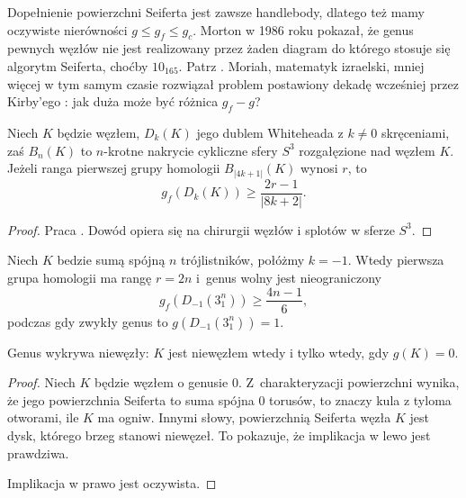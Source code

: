 Dopełnienie powierzchni Seiferta jest zawsze handlebody, dlatego też mamy oczywiste nierówności $g \le g_f \le g_c$.
Morton w 1986 roku pokazał, że genus pewnych węzłów nie jest realizowany przez żaden diagram do którego stosuje się algorytm Seiferta, choćby $10_{165}$.
Patrz \cite{morton86}.
Moriah, matematyk izraelski, mniej więcej w tym samym czasie rozwiązał problem postawiony dekadę wcześniej przez Kirby'ego \cite{kirby78}: jak duża może być różnica $g_f - g$?

\begin{proposition}
    Niech $K$ będzie węzłem, $D_k(K)$ jego dublem Whiteheada z $k \neq 0$ skręceniami, zaś $B_n(K)$ to $n$-krotne nakrycie cykliczne sfery $S^3$ rozgałęzione nad węzłem $K$.
    Jeżeli ranga pierwszej grupy homologii $B_{|4k+1|}(K)$ wynosi $r$, to
    \begin{equation}
        g_f(D_k(K)) \ge \frac {2r-1} {|8k+2|}.
    \end{equation}
\end{proposition}

\begin{proof}
    Praca \cite{moriah87}.
    Dowód opiera się na chirurgii węzłów i splotów w sferze $S^3$.
\end{proof}

\begin{corollary}
    Niech $K$ bedzie sumą spójną $n$ trójlistników, połóżmy $k = -1$.
    Wtedy pierwsza grupa homologii ma rangę $r = 2n$ i~genus wolny jest nieograniczony
    \begin{equation}
        g_f(D_{-1}(3_1^n)) \ge \frac {4n-1} {6},
    \end{equation}
    podczas gdy zwykły genus to $g(D_{-1}(3_1^n)) = 1$.
\end{corollary}

\begin{proposition}
    \label{genus_one}
    Genus wykrywa niewęzły: $K$ jest niewęzłem wtedy i tylko wtedy, gdy $g(K) = 0$.
\end{proposition}

\begin{proof}
    Niech $K$ będzie węzłem o genusie $0$.
    Z~charakteryzacji powierzchni wynika, że jego powierzchnia Seiferta to suma spójna $0$ torusów, to znaczy kula z tyloma otworami, ile $K$ ma ogniw.
    Innymi słowy, powierzchnią Seiferta węzła $K$ jest dysk, którego brzeg stanowi niewęzeł.
    To pokazuje, że implikacja w lewo jest prawdziwa.

    Implikacja w prawo jest oczywista.
\end{proof}

